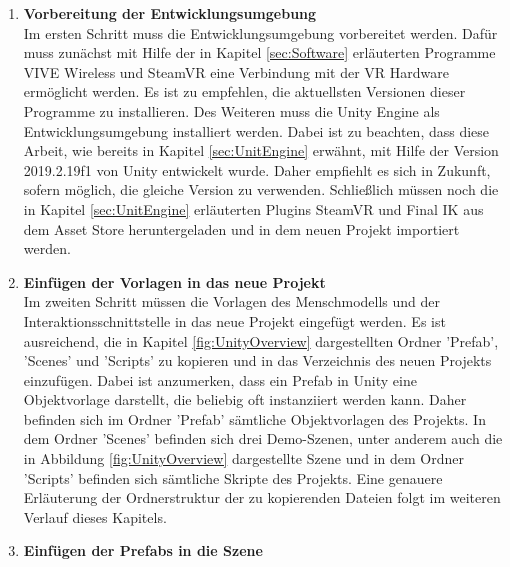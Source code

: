 \begin{enumerate}
	\item \textbf{Vorbereitung der Entwicklungsumgebung} \\
	Im ersten Schritt muss die Entwicklungsumgebung vorbereitet werden. Dafür muss zunächst mit Hilfe der in Kapitel \ref{sec:Software} erläuterten Programme VIVE Wireless und SteamVR eine Verbindung mit der VR Hardware ermöglicht werden. Es ist zu empfehlen, die aktuellsten Versionen dieser Programme zu installieren. Des Weiteren muss die Unity Engine als Entwicklungsumgebung installiert werden. Dabei ist zu beachten, dass diese Arbeit, wie bereits in Kapitel \ref{sec:UnitEngine} erwähnt, mit Hilfe der Version 2019.2.19f1 von Unity entwickelt wurde. Daher empfiehlt es sich in Zukunft, sofern möglich, die gleiche Version zu verwenden. Schließlich müssen noch die in Kapitel \ref{sec:UnitEngine} erläuterten Plugins SteamVR und Final IK aus dem Asset Store heruntergeladen und in dem neuen Projekt importiert werden.
	\item \textbf{Einfügen der Vorlagen in das neue Projekt} \\
	Im zweiten Schritt müssen die Vorlagen des Menschmodells und der Interaktionsschnittstelle in das neue Projekt eingefügt werden. Es ist ausreichend, die in Kapitel \ref{fig:UnityOverview} dargestellten Ordner 'Prefab', 'Scenes' und 'Scripts' zu kopieren und in das Verzeichnis des neuen Projekts einzufügen. Dabei ist anzumerken, dass ein Prefab in Unity eine Objektvorlage darstellt, die beliebig oft instanziiert werden kann. Daher befinden sich im Ordner 'Prefab' sämtliche Objektvorlagen des Projekts. In dem Ordner 'Scenes' befinden sich drei Demo-Szenen, unter anderem auch die in Abbildung \ref{fig:UnityOverview} dargestellte Szene und in dem Ordner 'Scripts' befinden sich sämtliche Skripte des Projekts. Eine genauere Erläuterung der Ordnerstruktur der zu kopierenden Dateien folgt im weiteren Verlauf dieses Kapitels.
	\item \textbf{Einfügen der Prefabs in die Szene} \\

\end{enumerate}
